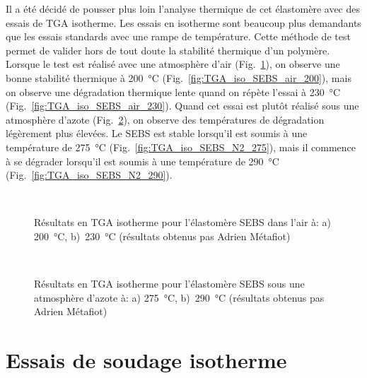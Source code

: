 Il a été décidé de pousser plus loin l'analyse thermique de cet élastomère avec des essais de TGA isotherme. 
Les essais en isotherme sont beaucoup plus demandants que les essais standards avec une rampe de température. 
Cette méthode de test permet de valider hors de tout doute la stabilité thermique d'un polymère. 
Lorsque le test est réalisé avec une atmosphère d'air (Fig.~\ref{fig:TGA_iso_SEBS_air}), on observe une bonne stabilité thermique à \SI[locale=FR]{200}{\celsius} (Fig.~\ref{fig:TGA_iso_SEBS_air_200}), mais on observe une dégradation thermique lente quand on répète l'essai à \SI[locale=FR]{230}{\celsius} (Fig.~\ref{fig:TGA_iso_SEBS_air_230}). 
Quand cet essai est plutôt réalisé sous une atmosphère d'azote (Fig.~\ref{fig:TGA_iso_SEBS_N2}), on observe des températures de dégradation légèrement plus élevées. 
Le SEBS est stable lorsqu'il est soumis à une température de \SI[locale=FR]{275}{\celsius} (Fig.~\ref{fig:TGA_iso_SEBS_N2_275}), mais il commence à se dégrader lorsqu'il est soumis à une température de \SI[locale=FR]{290}{\celsius} (Fig.~\ref{fig:TGA_iso_SEBS_N2_290}). 

\begin{figure}[h]
	\centering
	\\
	\caption{Résultats en TGA isotherme pour l'élastomère SEBS dans l'air à: a) \SI{200}{\celsius}, b)~\SI{230}{\celsius} (résultats obtenus pas Adrien Métafiot)}
	\label{fig:TGA_iso_SEBS_air}
\end{figure}

\begin{figure}[h]
	\centering
	\\
	\caption{Résultats en TGA isotherme pour l'élastomère SEBS sous une atmosphère d'azote à: a) \SI{275}{\celsius}, b)~\SI{290}{\celsius} (résultats obtenus pas Adrien Métafiot)}
	\label{fig:TGA_iso_SEBS_N2}
\end{figure}

\section{Essais de soudage isotherme}

